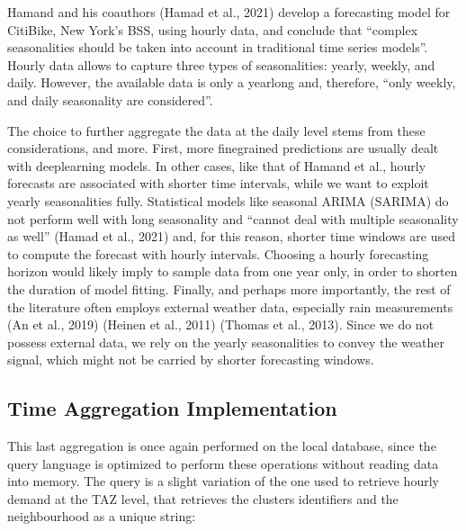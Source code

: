 \documentclass[letterpaper,10pt,english]{jupyterBook}
\begin{document}
\sphinxAtStartPar
Hamand and his coauthors (Hamad et al., 2021) develop a forecasting model for CitiBike, New York’s BSS, using hourly data, and conclude that “complex seasonalities should be taken into account in traditional time series models”. Hourly data allows to capture three types of seasonalities: yearly, weekly, and daily. However, the available data is only a year\sphinxhyphen{}long and, therefore, “only weekly, and daily seasonality are considered”.

\sphinxAtStartPar
The choice to further aggregate the data at the daily level stems from these considerations, and more. First, more fine\sphinxhyphen{}grained predictions are usually dealt with deep\sphinxhyphen{}learning models. In other cases, like that of Hamand et al., hourly forecasts are associated with shorter time intervals, while we want to exploit yearly seasonalities fully. Statistical models like seasonal ARIMA (SARIMA) do not perform well with long seasonality and “cannot deal with multiple seasonality as well” (Hamad et al., 2021) and, for this reason, shorter time windows are used to compute the forecast with hourly intervals. Choosing a hourly forecasting horizon would likely imply to sample data from one year only, in order to shorten the duration of model fitting. Finally, and perhaps more importantly, the rest of the literature often employs external weather data, especially rain measurements (An et al., 2019) (Heinen et al., 2011) (Thomas et al., 2013). Since we do not possess external data, we rely on the yearly seasonalities to convey the weather signal, which might not be carried by shorter forecasting windows.


\subsection{Time Aggregation Implementation}
\label{\detokenize{05-time_series_analysis:time-aggregation-implementation}}
\sphinxAtStartPar
This last aggregation is once again performed on the local database, since the query language is optimized to perform these operations without reading data into memory. The query is a slight variation of the one used to retrieve hourly demand at the TAZ level, that retrieves the clusters identifiers and the neighbourhood as a unique string:
\end{document}
